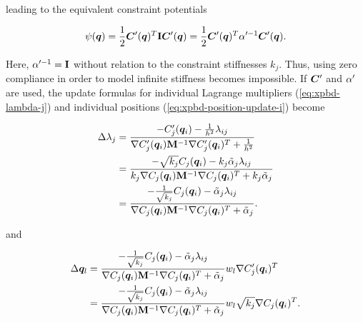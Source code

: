 \noindent leading to the equivalent constraint potentials

\begin{equation}\label{eq:xpbd-potential-2}
    \psi(\bm{q}) = \frac{1}{2} \bm{C}^{\prime}(\bm{q})^T \mathbf{I} \bm{C}^{\prime}(\bm{q}) 
    = \frac{1}{2} \bm{C}^{\prime}(\bm{q})^T \mathbf{\alpha}^{\prime -1} \bm{C}^{\prime}(\bm{q}).
\end{equation}  

\noindent Here, $\mathbf{\alpha}^{\prime -1} = \mathbf{I}$ without relation to the constraint stiffnesses $k_j$. Thus, using zero compliance in 
order to model infinite stiffness becomes impossible.  If $\bm{C}^{\prime}$ and 
$\mathbf{\alpha}^{\prime}$ are used, the update formulas for individual Lagrange multipliers (\cref{eq:xpbd-lambda-j}) and individual 
positions (\cref{eq:xpbd-position-update-i}) become

\begin{equation}\label{eq:xpbd-lambda-j-2}
    \begin{split}
    \Delta \lambda_j 
    &= \frac{-C^{\prime}_j(\bm{q}_i) - \frac{1}{h^2}\lambda_{ij}}{\nabla C^{\prime}_j(\bm{q}_i)\mathbf{M}^{-1} \nabla C^{\prime}_j(\bm{q}_i)^T + \frac{1}{h^2}} \\
    &= \frac{-\sqrt{k_j}C_j(\bm{q}_i) - k_j \tilde{\alpha}_j \lambda_{ij}}{k_j \nabla C_j(\bm{q}_i)\mathbf{M}^{-1} \nabla C_j(\bm{q}_i)^T + k_j \tilde{\alpha}_j} \\
    &= \frac{-\frac{1}{\sqrt{k_j}}C_j(\bm{q}_i) - \tilde{\alpha}_j \lambda_{ij}}{\nabla C_j(\bm{q}_i)\mathbf{M}^{-1} \nabla C_j(\bm{q}_i)^T + \tilde{\alpha}_j}.
    \end{split}
\end{equation}

\noindent and 

\begin{equation}\label{eq:xpbd-position-update-i-2}
    \begin{split}
    \Delta \bm{q}_l
    &= \frac{-\frac{1}{\sqrt{k_j}}C_j(\bm{q}_i) - \tilde{\alpha}_j \lambda_{ij}}{\nabla C_j(\bm{q}_i)\mathbf{M}^{-1} \nabla C_j(\bm{q}_i)^T + \tilde{\alpha}_j}
    w_l \nabla C^{\prime}_j(\bm{q}_i)^T \\
    &= \frac{-\frac{1}{\sqrt{k_j}}C_j(\bm{q}_i) - \tilde{\alpha}_j \lambda_{ij}}{\nabla C_j(\bm{q}_i)\mathbf{M}^{-1} \nabla C_j(\bm{q}_i)^T + \tilde{\alpha}_j}
    w_l \sqrt{k_j} \nabla C_j(\bm{q}_i)^T.
    \end{split}
\end{equation}

